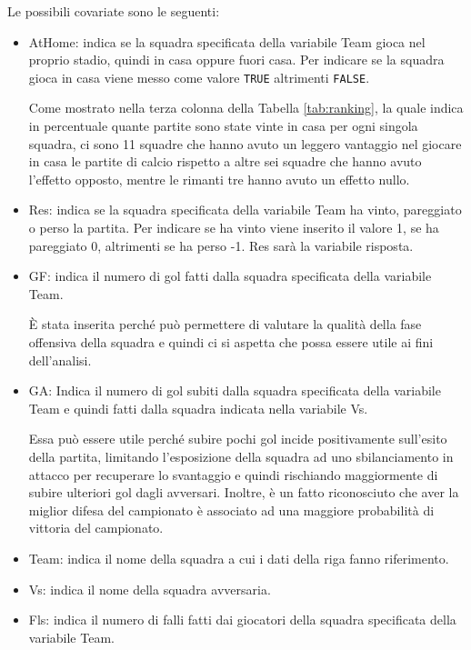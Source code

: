 Le possibili covariate sono le seguenti:
\begin{itemize}
	\item \textsf{AtHome}: indica se la squadra specificata della variabile \textsf{Team} gioca nel proprio stadio, quindi in casa oppure fuori casa. Per indicare se la squadra gioca in casa viene messo come valore \texttt{TRUE} altrimenti \texttt{FALSE}. 
	
	Come mostrato nella terza colonna della Tabella \ref{tab:ranking}, la quale indica in percentuale quante partite sono state vinte in casa per ogni singola squadra, ci sono 11 squadre che hanno avuto un leggero vantaggio nel giocare in casa le partite di calcio rispetto a altre sei squadre che hanno avuto l'effetto opposto, mentre le rimanti tre hanno avuto un effetto nullo.
	\item \textsf{Res}: indica se la squadra specificata della variabile \textsf{Team} ha vinto, pareggiato o perso la partita. Per indicare se ha vinto viene inserito il valore 1, se ha pareggiato 0, altrimenti se ha perso -1. Res sarà la variabile risposta.
	\item \textsf{GF}: indica il numero di gol fatti dalla squadra specificata della variabile \textsf{Team}. 
	
	È stata inserita perché può permettere di valutare la qualità della fase offensiva della squadra e quindi ci si aspetta che possa essere utile ai fini dell'analisi.
	\item \textsf{GA}: Indica il numero di gol subiti dalla squadra specificata della variabile \textsf{Team} e quindi fatti dalla squadra indicata nella variabile \textsf{Vs}. 
	
	Essa può essere utile perché subire pochi gol incide positivamente sull'esito della partita, limitando l'esposizione della squadra ad uno sbilanciamento in attacco per recuperare lo svantaggio e quindi rischiando maggiormente di subire ulteriori gol dagli avversari. Inoltre, è un fatto riconosciuto che aver la miglior difesa del campionato è associato ad una maggiore probabilità di vittoria del campionato.
	\item \textsf{Team}: indica il nome della squadra a cui i dati della riga fanno riferimento.
	\item \textsf{Vs}: indica il nome della squadra avversaria.
	
	\item \textsf{Fls}: indica il numero di falli fatti dai giocatori della squadra specificata della variabile \textsf{Team}. 
	

\end{itemize}
